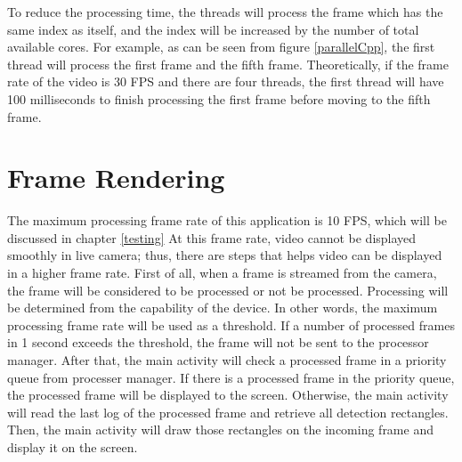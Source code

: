         To reduce the processing time,
        the threads will process the frame which has the same index as itself,
        and the index will be increased by the number of total available cores.
        For example, as can be seen from figure \ref{parallelCpp},
        the first thread will process the first frame and the fifth frame.
        Theoretically, if the frame rate of the video is 30 FPS and there are four threads,
        the first thread will have 100 milliseconds to finish processing the first frame before moving to the fifth frame.

    \section{Frame Rendering}
        The maximum processing frame rate of this application is 10 FPS, which will be discussed in chapter \ref{testing}
        At this frame rate, video cannot be displayed smoothly in live camera;
        thus, there are steps that helps video can be displayed in a higher frame rate.
        First of all, when a frame is streamed from the camera,
        the frame will be considered to be processed or not be processed.
        Processing will be determined from the capability of the device.
        In other words, the maximum processing frame rate will be used as a threshold.
        If a number of processed frames in 1 second exceeds the threshold,
        the frame will not be sent to the processor manager.
        After that, the main activity will check a processed frame in a priority queue from processer manager.
        If there is a processed frame in the priority queue, the processed frame will be displayed to the screen.
        Otherwise, the main activity will read the last log of the processed frame and retrieve all detection rectangles.
        Then, the main activity will draw those rectangles on the incoming frame and display it on the screen.
